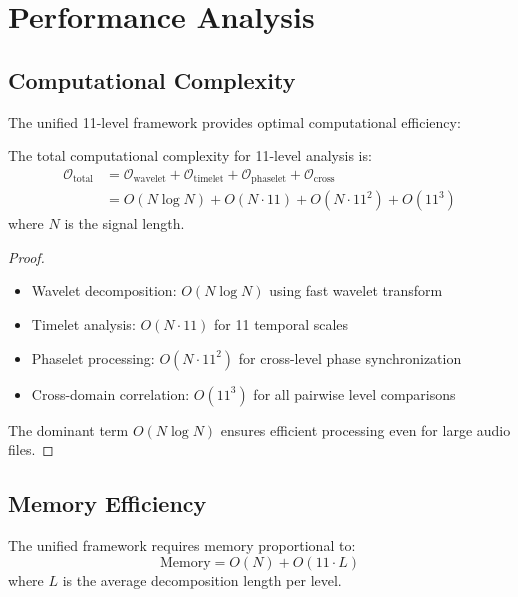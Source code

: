 \section{Performance Analysis}

\subsection{Computational Complexity}

The unified 11-level framework provides optimal computational efficiency:

\begin{theorem}
The total computational complexity for 11-level analysis is:
\begin{align}
\mathcal{O}_{\text{total}} &= \mathcal{O}_{\text{wavelet}} + \mathcal{O}_{\text{timelet}} + \mathcal{O}_{\text{phaselet}} + \mathcal{O}_{\text{cross}} \\
&= O(N \log N) + O(N \cdot 11) + O(N \cdot 11^2) + O(11^3)
\end{align}
where $N$ is the signal length.
\end{theorem}

\begin{proof}
\begin{itemize}
    \item Wavelet decomposition: $O(N \log N)$ using fast wavelet transform
    \item Timelet analysis: $O(N \cdot 11)$ for 11 temporal scales
    \item Phaselet processing: $O(N \cdot 11^2)$ for cross-level phase synchronization
    \item Cross-domain correlation: $O(11^3)$ for all pairwise level comparisons
\end{itemize}
The dominant term $O(N \log N)$ ensures efficient processing even for large audio files.
\end{proof}

\subsection{Memory Efficiency}

\begin{theorem}
The unified framework requires memory proportional to:
\begin{equation}
\text{Memory} = O(N) + O(11 \cdot L)
\end{equation}
where $L$ is the average decomposition length per level.
\end{theorem}

